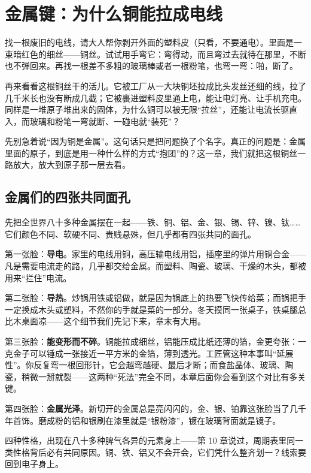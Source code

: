\chapter{金属键：为什么铜能拉成电线}

\begin{kaichang}
找一根废旧的电线，请大人帮你剥开外面的塑料皮（只看，不要通电）。里面是一束暗红色的细丝——铜丝。试试用手弯它：弯得动，而且弯过去就待在那里，不断也不弹回来。再找一根差不多粗的玻璃棒或者一根粉笔，也弯一弯：啪，断了。

再来看看这根铜丝干的活儿。它被工厂从一大块铜坯拉成比头发丝还细的线，拉了几千米长也没有断成几截；它被裹进塑料皮里通上电，能让电灯亮、让手机充电。同样是一堆原子堆出来的固体，为什么铜可以被无限“拉丝”，还能让电流长驱直入，而玻璃和粉笔一弯就断、一碰电就“装死”？

先别急着说“因为铜是金属”。这句话只是把问题换了个名字。真正的问题是：金属里面的原子，到底是用一种什么样的方式“抱团”的？这一章，我们就把这根铜丝一路放大，放大到原子那一层去看。
\end{kaichang}

\section{金属们的四张共同面孔}

先把全世界八十多种金属摆在一起——铁、铜、铝、金、银、锡、锌、镍、钛……它们颜色不同、软硬不同、贵贱悬殊，但几乎都有四张共同的面孔。

第一张脸：\textbf{导电}。家里的电线用铜，高压输电线用铝，插座里的弹片用铜合金——凡是需要电流走的路，几乎都交给金属。而塑料、陶瓷、玻璃、干燥的木头，都被用来“拦住”电流。

第二张脸：\textbf{导热}。炒锅用铁或铝做，就是因为锅底上的热要飞快传给菜；而锅把手一定换成木头或塑料，不然你的手就是菜的一部分。冬天摸同一张桌子，铁桌腿总比木桌面凉——这个细节我们先记下来，章末有大用。

第三张脸：\textbf{能变形而不碎}。铜能拉成细丝，铝能压成比纸还薄的箔，金更夸张：一克金子可以锤成一张接近一平方米的金箔，薄到透光。工匠管这种本事叫“延展性”。你反复弯一根回形针，它会越弯越硬、最后才断；而食盐晶体、玻璃、陶瓷，稍微一掰就裂——这两种“死法”完全不同，本章后面你会看到这个对比有多关键。

第四张脸：\textbf{金属光泽}。新切开的金属总是亮闪闪的，金、银、铂靠这张脸当了几千年首饰。磨成粉的铝和银刷在漆里就是“银粉漆”，镀在玻璃背面就是镜子。

四种性格，出现在八十多种脾气各异的元素身上——第 10 章说过，周期表里同一类性格背后必有共同原因。铜、铁、铝又不会开会，它们凭什么整齐划一？线索要回到电子身上。

